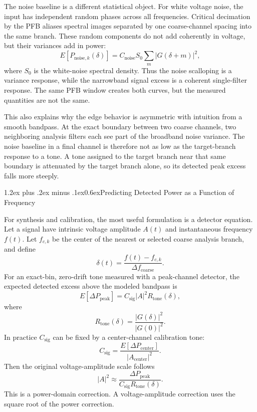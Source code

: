 \documentclass[10pt]{article}
\makeatletter
\renewcommand\section{\@startsection{section}{1}{0pt}%
  {1.2ex plus .2ex minus .1ex}{0.6ex}{\normalsize\bfseries}}
\makeatother
\begin{document}
The noise baseline is a different statistical object.  For white voltage noise,
the input has independent random phases across all frequencies.  Critical
decimation by the PFB aliases spectral images separated by one coarse-channel
spacing into the same branch.  These random components do not add coherently in
voltage, but their variances add in power:
\[
    E[P_{\mathrm{noise},k}(\delta)]
    = C_{\mathrm{noise}} S_0
      \sum_m |G(\delta + m)|^2 ,
\]
where $S_0$ is the white-noise spectral density.  Thus the noise scalloping is a
variance response, while the narrowband signal excess is a coherent
single-filter response.  The same PFB window creates both curves, but the
measured quantities are not the same.

This also explains why the edge behavior is asymmetric with intuition from a
smooth bandpass.  At the exact boundary between two coarse channels, two
neighboring analysis filters each see part of the broadband noise variance.  The
noise baseline in a final channel is therefore not as low as the target-branch
response to a tone.  A tone assigned to the target branch near that same
boundary is attenuated by the target branch alone, so its detected peak excess
falls more steeply.

\section{Predicting Detected Power as a Function of Frequency}

For synthesis and calibration, the most useful formulation is a detector
equation.  Let a signal have intrinsic voltage amplitude $A(t)$ and instantaneous
frequency $f(t)$.  Let $f_{c,k}$ be the center of the nearest or selected coarse
analysis branch, and define
\[
    \delta(t) = \frac{f(t) - f_{c,k}}{\Delta f_{\mathrm{coarse}}}.
\]
For an exact-bin, zero-drift tone measured with a peak-channel detector, the
expected detected excess above the modeled bandpass is
\[
    E[\Delta P_{\mathrm{peak}}]
    = C_{\mathrm{sig}} |A|^2 R_{\mathrm{tone}}(\delta),
\]
where
\[
    R_{\mathrm{tone}}(\delta) =
    \frac{|G(\delta)|^2}{|G(0)|^2}.
\]
In practice $C_{\mathrm{sig}}$ can be fixed by a center-channel calibration tone:
\[
    C_{\mathrm{sig}} =
    \frac{E[\Delta P_{\mathrm{center}}]}{|A_{\mathrm{center}}|^2}.
\]
Then the original voltage-amplitude scale follows
\[
    |A|^2 \approx
    \frac{\Delta P_{\mathrm{peak}}}
         {C_{\mathrm{sig}} R_{\mathrm{tone}}(\delta)}.
\]
This is a power-domain correction.  A voltage-amplitude correction uses the
square root of the power correction.
\end{document}
